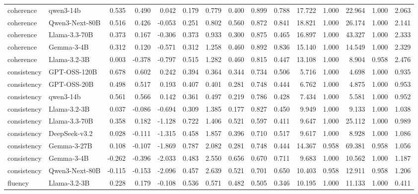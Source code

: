 \begin{table}[t]
{\begin{tabular}{llrrrrrrrrrrrrr}
coherence & qwen3-14b & 0.535 & 0.490 & 0.042 & 0.179 & 0.779 & 0.400 & 0.899 & 0.788 & 17.722 & 1.000 & 22.964 & 1.000 & 2.063 \\
coherence & Qwen3-Next-80B & 0.516 & 0.426 & -0.053 & 0.251 & 0.802 & 0.560 & 0.872 & 0.841 & 18.821 & 1.000 & 26.174 & 1.000 & 2.141 \\
coherence & Llama-3.3-70B & 0.373 & 0.167 & -0.306 & 0.373 & 0.933 & 0.300 & 0.875 & 0.465 & 16.897 & 1.000 & 43.327 & 1.000 & 2.333 \\
coherence & Gemma-3-4B & 0.312 & 0.120 & -0.571 & 0.312 & 1.258 & 0.460 & 0.892 & 0.836 & 15.140 & 1.000 & 14.549 & 1.000 & 2.329 \\
coherence & Llama-3.2-3B & 0.003 & -0.378 & -0.797 & 0.515 & 1.282 & 0.460 & 0.815 & 0.447 & 13.108 & 1.000 & 8.904 & 0.958 & 2.476 \\
consistency & GPT-OSS-120B & 0.678 & 0.602 & 0.242 & 0.394 & 0.364 & 0.344 & 0.734 & 0.506 & 5.716 & 1.000 & 4.698 & 1.000 & 0.935 \\
consistency & GPT-OSS-20B & 0.498 & 0.517 & 0.193 & 0.407 & 0.401 & 0.281 & 0.748 & 0.444 & 6.762 & 1.000 & 4.875 & 1.000 & 0.953 \\
consistency & qwen3-14b & 0.561 & 0.566 & 0.142 & 0.361 & 0.497 & 0.219 & 0.786 & 0.428 & 7.434 & 1.000 & 5.581 & 1.000 & 0.952 \\
consistency & Llama-3.2-3B & 0.037 & -0.086 & -0.694 & 0.309 & 1.385 & 0.177 & 0.827 & 0.450 & 9.949 & 1.000 & 9.133 & 1.000 & 1.038 \\
consistency & Llama-3.3-70B & 0.358 & 0.182 & -1.128 & 0.722 & 1.406 & 0.521 & 0.597 & 0.411 & 9.647 & 1.000 & 25.112 & 1.000 & 0.989 \\
consistency & DeepSeek-v3.2 & 0.028 & -0.111 & -1.315 & 0.458 & 1.857 & 0.396 & 0.710 & 0.517 & 9.617 & 1.000 & 8.928 & 1.000 & 1.086 \\
consistency & Gemma-3-27B & 0.108 & -0.107 & -1.869 & 0.787 & 2.082 & 0.281 & 0.748 & 0.444 & 14.367 & 0.958 & 69.381 & 0.958 & 1.056 \\
consistency & Gemma-3-4B & -0.262 & -0.396 & -2.033 & 0.483 & 2.550 & 0.656 & 0.670 & 0.711 & 9.683 & 1.000 & 10.562 & 1.000 & 1.187 \\
consistency & Qwen3-Next-80B & -0.115 & -0.153 & -2.096 & 0.457 & 2.639 & 0.521 & 0.701 & 0.650 & 10.403 & 0.958 & 12.911 & 0.958 & 1.206 \\
fluency & Llama-3.2-3B & 0.228 & 0.179 & -0.108 & 0.536 & 0.571 & 0.482 & 0.505 & 0.346 & 10.195 & 1.000 & 11.133 & 1.000 & 0.411 \\

\end{tabular}}
\end{table}
